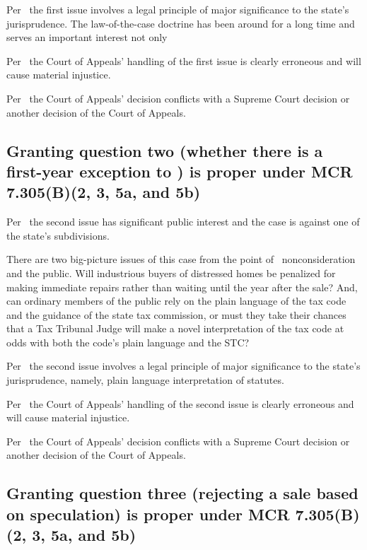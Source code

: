 \documentclass[12pt,\documentclassflag]{michiganCourtOfAppealsBrief}
\begin{document}
Per \cite{MCR 7.305(B)(3)}\ the first issue involves a legal principle of major significance to the state's jurisprudence. The law-of-the-case doctrine has been around for a long time and serves an important interest not only 

Per \cite{MCR 7.305(B)(5a)}\ the Court of Appeals' handling of the first issue is clearly erroneous and will cause material injustice.

Per \cite{MCR 7.305(B)(5b)}\ the Court of Appeals' decision conflicts with a Supreme Court decision or another decision of the Court of Appeals. 

\subsection{Granting question two (whether there is a first-year exception to \mathieuGast) is proper under MCR 7.305(B)(2, 3, 5a, and 5b)}

Per \cite{MCR 7.305(B)(2)}\ the second issue has significant public interest and the case is against one of the state's subdivisions.

There are two big-picture issues of this case from the point of \mathieuGast\ nonconsideration and the public. Will industrious buyers of distressed homes be penalized for making immediate repairs rather than waiting until the year after the sale? And, can ordinary members of the public rely on the plain language of the tax code and the guidance of the state tax commission, or must they take their chances that a Tax Tribunal Judge will make a novel interpretation of the tax code at odds with both the code's plain language and the STC?

Per \cite{MCR 7.305(B)(3)}\ the second issue involves a legal principle of major significance to the state's jurisprudence, namely, plain language interpretation of statutes. 

Per \cite{MCR 7.305(B)(5a)}\ the Court of Appeals' handling of the second issue is clearly erroneous and will cause material injustice.

Per \cite{MCR 7.305(B)(5b)}\ the Court of Appeals' decision conflicts with a Supreme Court decision or another decision of the Court of Appeals. 

\subsection{Granting question three (rejecting a sale based on speculation) is proper under MCR 7.305(B)(2, 3, 5a, and 5b)}
\end{document}
